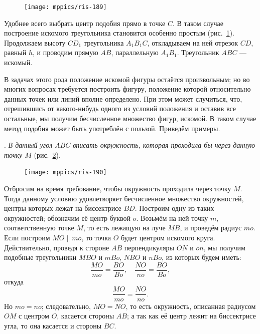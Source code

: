 \documentclass[twoside]{book}
\begin{document}
\begin{figure}
\centering
\texttt{[image: mppics/ris-189]}
\caption{}\label{1938/ris-189}
\end{figure}

Удобнее всего выбрать центр подобия прямо в точке $C$.
В таком случае построение искомого треугольника становится особенно простым (рис.~\ref{1938/ris-189}).
Продолжаем высоту $CD_1$ треугольника $A_1B_1C$, откладываем на ней отрезок $CD$, равный $h$, и проводим прямую $AB$, параллельную $A_1B_1$.
Треугольник $ABC$ — искомый. 

\medskip

{\sloppy

В задачах этого рода положение искомой фигуры остаётся произвольным;
но во многих вопросах требуется построить фигуру, положение которой относительно данных точек или линий вполне определено.
При этом может случиться, что, отрешившись от какого-нибудь одного из условий положения и оставив все остальные, мы получим бесчисленное множество фигур,  искомой.
В таком случае метод подобия может быть употреблён с пользой.
Приведём примеры.

}

\smallskip
{}.
\emph{В данный угол $ABC$ вписать окружность, которая проходила бы через данную точку $M$} (рис.~\ref{1938/ris-190}).

\begin{figure}[h]
\centering
\texttt{[image: mppics/ris-190]}
\caption{}\label{1938/ris-190}
\end{figure}

Отбросим на время требование, чтобы окружность проходила через точку $M$.
Тогда данному условию удовлетворяет бесчисленное множество окружностей, центры которых лежат на биссектрисе $BD$.
Построим одну из таких окружностей; обозначим её центр буквой $o$. 
Возьмём на ней точку $m$, соответственную точке $M$, то есть лежащую на луче $MB$, и проведём радиус $mo$.
Если построим $MO\parallel mo$, то точка $O$ будет центром искомого круга.
Действительно, проведя к стороне $AB$ перпендикуляры $ON$ и $on$, мы получим подобные треугольники $MBO$ и $mBo$, $NBO$ и $nBo$, из которых будем иметь:
\[\frac{MO}{mo} = \frac{BO}{Bo}, \quad 
 \frac{NO}{no} = \frac{BO}{Bo},
\]
откуда 
\[\frac{MO}{mo} = \frac{NO}{no}.\]
Но $mo =no$;
следовательно, $MO=NO$, то есть окружность, описанная радиусом $OM$ с центром $O$, касается стороны $AB$;
а так как её центр лежит на биссектрисе угла, то она касается и стороны $BC$.
\end{document}
